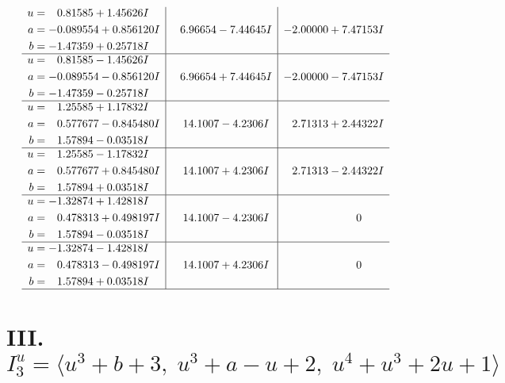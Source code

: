 \documentclass[1p]{elsarticle_modified}
\theoremstyle{definition}
\begin{document}
$$\begin{array}{c|c|c}
\begin{aligned}
u &= \phantom{-}0.81585 + 1.45626 I \\
a &= -0.089554 + 0.856120 I \\
b &= -1.47359 + 0.25718 I\end{aligned}
 & \phantom{-}6.96654 - 7.44645 I & -2.00000 + 7.47153 I \\ \hline\begin{aligned}
u &= \phantom{-}0.81585 - 1.45626 I \\
a &= -0.089554 - 0.856120 I \\
b &= -1.47359 - 0.25718 I\end{aligned}
 & \phantom{-}6.96654 + 7.44645 I & -2.00000 - 7.47153 I \\ \hline\begin{aligned}
u &= \phantom{-}1.25585 + 1.17832 I \\
a &= \phantom{-}0.577677 - 0.845480 I \\
b &= \phantom{-}1.57894 - 0.03518 I\end{aligned}
 & \phantom{-}14.1007 - 4.2306 I & \phantom{-}2.71313 + 2.44322 I \\ \hline\begin{aligned}
u &= \phantom{-}1.25585 - 1.17832 I \\
a &= \phantom{-}0.577677 + 0.845480 I \\
b &= \phantom{-}1.57894 + 0.03518 I\end{aligned}
 & \phantom{-}14.1007 + 4.2306 I & \phantom{-}2.71313 - 2.44322 I \\ \hline\begin{aligned}
u &= -1.32874 + 1.42818 I \\
a &= \phantom{-}0.478313 + 0.498197 I \\
b &= \phantom{-}1.57894 - 0.03518 I\end{aligned}
 & \phantom{-}14.1007 - 4.2306 I & \phantom{-0.000000 } 0 \\ \hline\begin{aligned}
u &= -1.32874 - 1.42818 I \\
a &= \phantom{-}0.478313 - 0.498197 I \\
b &= \phantom{-}1.57894 + 0.03518 I\end{aligned}
 & \phantom{-}14.1007 + 4.2306 I & \phantom{-0.000000 } 0\\
 \hline 
 \end{array}$$\newpage\newpage\renewcommand{\arraystretch}{1}
\centering \section*{III. $I^u_{3}= \langle u^3+b+3,\;u^3+a- u+2,\;u^4+u^3+2 u+1 \rangle$}
\end{document}
